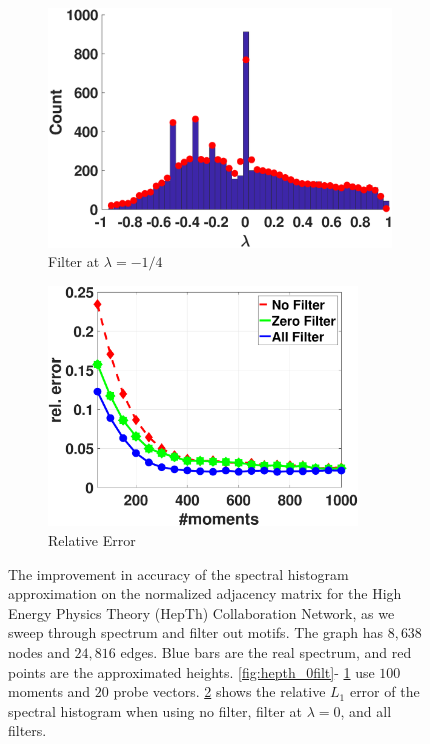 \begin{figure}
  \begin{subfigure}{0.47\textwidth}
    \centering
    \captionsetup{justification=centering}
    \includegraphics[width=\textwidth,trim = .3cm 0.5cm 3.2cm 1.3cm,clip]
    {./ndos/pics/hepth_fourfilter}
    \caption{Filter at $\lambda=-1/4$}\label{fig:hepth_4filt}
  \end{subfigure}
  \hspace{0.8cm}
  \begin{subfigure}{0.47\textwidth}
    \centering
    \captionsetup{justification=centering}
    \includegraphics[width=0.9\textwidth,trim = .3cm 0cm 1.5cm 1.3cm,clip]
    {./ndos/pics/filter_error}
    \caption{Relative Error}\label{fig:hepth_error}
  \end{subfigure}
  \caption{The improvement in accuracy of the spectral histogram approximation
  on the normalized adjacency matrix for the High Energy Physics Theory (HepTh)
  Collaboration Network, as we sweep through spectrum and filter out motifs. The
  graph has $8,638$ nodes and $24,816$ edges. Blue bars are the real spectrum,
  and red points are the approximated heights. \cref{fig:hepth_0filt}-
  \ref{fig:hepth_4filt} use $100$ moments and $20$ probe vectors. \cref{fig:hepth_error} shows the relative $L_1$ error of the spectral
  histogram when using no filter, filter at $\lambda=0$, and all filters.}
  \label{fig:motif_filt}
\end{figure}